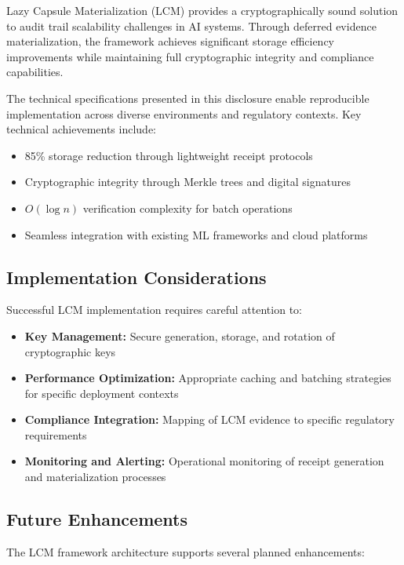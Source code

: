 \documentclass[12pt,a4paper]{article}
\begin{document}
Lazy Capsule Materialization (LCM) provides a cryptographically sound solution to audit trail scalability challenges in AI systems. Through deferred evidence materialization, the framework achieves significant storage efficiency improvements while maintaining full cryptographic integrity and compliance capabilities.

The technical specifications presented in this disclosure enable reproducible implementation across diverse environments and regulatory contexts. Key technical achievements include:

\begin{itemize}
\item 85\% storage reduction through lightweight receipt protocols
\item Cryptographic integrity through Merkle trees and digital signatures  
\item $O(\log n)$ verification complexity for batch operations
\item Seamless integration with existing ML frameworks and cloud platforms
\end{itemize}

\subsection{Implementation Considerations}

Successful LCM implementation requires careful attention to:

\begin{itemize}
\item \textbf{Key Management:} Secure generation, storage, and rotation of cryptographic keys
\item \textbf{Performance Optimization:} Appropriate caching and batching strategies for specific deployment contexts
\item \textbf{Compliance Integration:} Mapping of LCM evidence to specific regulatory requirements
\item \textbf{Monitoring and Alerting:} Operational monitoring of receipt generation and materialization processes
\end{itemize}

\subsection{Future Enhancements}

The LCM framework architecture supports several planned enhancements:
\end{document}
